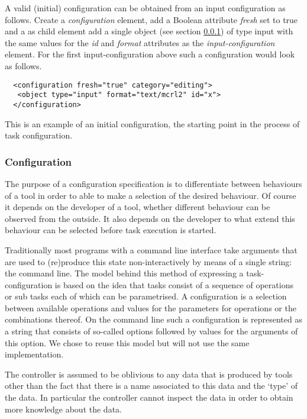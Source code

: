 \documentclass{article}
\begin{document}
   A valid (initial) configuration can be obtained from an input configuration
   as follows.  Create a \textit{configuration} element, add a Boolean
   attribute \textit{fresh} set to true and a as child element add a single
   object (see section \ref{ss:implementation_configuration}) of type input
   with the same values for the \textit{id} and \textit{format} attributes as
   the \textit{input-configuration} element. For the first input-configuration
   above such a configuration would look as follows.
   \small \begin{verbatim}
  <configuration fresh="true" category="editing">
   <object type="input" format="text/mcrl2" id="x">
  </configuration>\end{verbatim} \normalsize
  
   This is an example of an initial configuration, the starting point in the
   process of task configuration.

  \subsubsection{Configuration} \label{ss:implementation_configuration}

   The purpose of a configuration specification is to differentiate between
   behaviours of a tool in order to able to make a selection of the desired
   behaviour. Of course it depends on the developer of a tool, whether
   different behaviour can be observed from the outside. It also depends on the
   developer to what extend this behaviour can be selected before task
   execution is started.

   Traditionally most programs with a command line interface take arguments
   that are used to (re)produce this state non-interactively by means of a
   single string: the command line. The model behind this method of expressing
   a task-configuration is based on the idea that tasks consist of a sequence
   of operations or sub tasks each of which can be parametrised.  A
   configuration is a selection between available operations and values for the
   parameters for operations or the combinations thereof. On the command line such a
   configuration is represented as a string that consists of so-called options
   followed by values for the arguments of this option. We chose to reuse this
   model but will not use the same implementation.

   The controller is assumed to be oblivious to any data that is produced by
   tools other than the fact that there is a name associated to this data and
   the `type' of the data.  In particular the controller cannot inspect the
   data in order to obtain more knowledge about the data.
\end{document}
